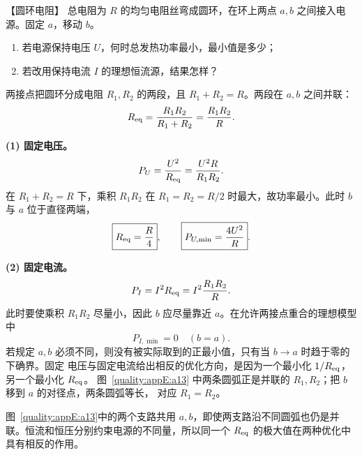 \begin{origexamplebox}{【圆环电阻】}\label{appE:ex:s22-33-7}
总电阻为 $R$ 的均匀电阻丝弯成圆环，在环上两点 $a,b$ 之间接入电源。固定 $a$，移动 $b$。
\begin{enumerate}[label=(\arabic*),leftmargin=2.2em]
  \item 若电源保持电压 $U$，何时总发热功率最小，最小值是多少；
  \item 若改用保持电流 $I$ 的理想恒流源，结果怎样？
\end{enumerate}

\end{origexamplebox}

\begin{xesolution}
两接点把圆环分成电阻 $R_1,R_2$ 的两段，且 $R_1+R_2=R$。两段在 $a,b$ 之间并联：
\begin{equation}
  R_{\rm eq}=\frac{R_1R_2}{R_1+R_2}=\frac{R_1R_2}{R}.
\end{equation}

\textbf{(1) 固定电压。}
\[
  P_U=\frac{U^2}{R_{\rm eq}}=\frac{U^2R}{R_1R_2}.
\]
在 $R_1+R_2=R$ 下，乘积 $R_1R_2$ 在 $R_1=R_2=R/2$ 时最大，故功率最小。此时 $b$ 与 $a$
位于直径两端，
\begin{equation}
  \boxed{R_{\rm eq}=\frac R4},
  \qquad
  \boxed{P_{U,\min}=\frac{4U^2}{R}}.
\end{equation}

\textbf{(2) 固定电流。}
\[
  P_I=I^2R_{\rm eq}=I^2\frac{R_1R_2}{R}.
\]
此时要使乘积 $R_1R_2$ 尽量小，因此 $b$ 应尽量靠近 $a$。在允许两接点重合的理想模型中
\begin{equation}
  \boxed{P_{I,\min}=0\quad(b=a)}.
\end{equation}
若规定 $a,b$ 必须不同，则没有被实际取到的正最小值，只有当 $b\to a$ 时趋于零的下确界。固定
电压与固定电流给出相反的优化方向，是因为一个最小化 $1/R_{\rm eq}$，另一个最小化
$R_{\rm eq}$。
图~\ref{quality:appE:a13} 中两条圆弧正是并联的 $R_1,R_2$；把 $b$ 移到 $a$ 的对径点，两条圆弧等长，
对应 $R_1=R_2$。


图~\ref{quality:appE:a13}中的两个支路共用 $a,b$，即使两支路沿不同圆弧也仍是并联。恒流和恒压分别约束电源的不同量，所以同一个 $R_{\rm eq}$ 的极大值在两种优化中具有相反的作用。
\end{xesolution}

\endgroup

